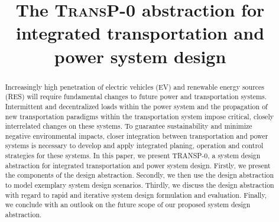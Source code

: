 \title{The \textsc{TransP-0} abstraction for integrated transportation and power system design}

\author{
	\and
}

\maketitle

\begin{abstract}
	Increasingly high penetration of electric vehicles (EV) and renewable energy sources (RES) will require fundamental changes to future power and transportation systems. Intermittent and decentralized loads within the power system and the propagation of new transportation paradigms within the transportation system impose critical, closely interrelated changes on these systems.
	To guarantee sustainability and minimize negative environmental impacts, closer integration between transportation and power systems is necessary to develop and apply integrated planing, operation and control strategies for these systems. In this paper, we present TRANSP-0, a system design abstraction for integrated transportation and power system design. Firstly, we present the components of the design abstraction. Secondly, we then use the design abstraction to model exemplary system design scenarios. Thirdly, we discuss the design abstraction with regard to rapid and iterative system design formulation and evaluation. Finally, we conclude with an outlook on the future scope of our proposed system design abstraction.
\end{abstract}
